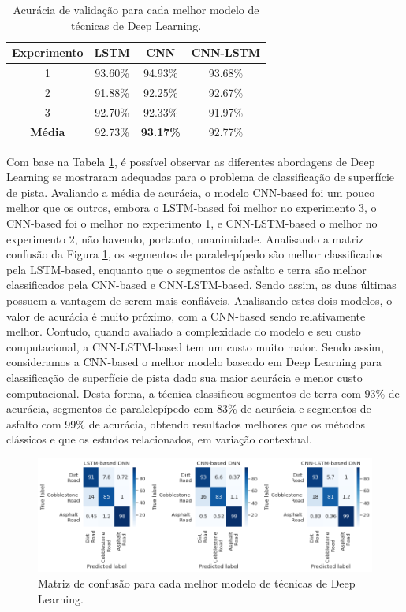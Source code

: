 \begin{table}[h!]
\caption{Acurácia de validação para cada melhor modelo de técnicas de Deep Learning.} 
\label{table:deep_ml_results}
\centering
\small
\begin{tabular}{cccc}
\toprule
\textbf{Experimento} & 
\textbf{LSTM} & 
\textbf{CNN} & 
\textbf{CNN-LSTM} \\ \midrule
1 & 93.60\% & 94.93\% & 93.68\% \\ \midrule
2 & 91.88\% & 92.25\% & 92.67\% \\ \midrule
3 & 92.70\% & 92.33\% & 91.97\% \\ \midrule
\textbf{Média} & 92.73\% & \textbf{93.17\%} & 92.77\% \\ \bottomrule
\end{tabular}
\end{table}

Com base na Tabela \ref{table:deep_ml_results}, é possível observar as diferentes abordagens de Deep Learning se mostraram adequadas para o problema de classificação de superfície de pista. Avaliando a média de acurácia, o modelo CNN-based foi um pouco melhor que os outros, embora o LSTM-based foi melhor no experimento 3, o CNN-based foi o melhor no experimento 1, e CNN-LSTM-based o melhor no experimento 2, não havendo, portanto, unanimidade. Analisando a matriz confusão da Figura \ref{fig:confusion_matrix_deep}, os segmentos de paralelepípedo são melhor classificados pela LSTM-based, enquanto que o segmentos de asfalto e terra são melhor classificados pela CNN-based e CNN-LSTM-based. Sendo assim, as duas últimas possuem a vantagem de serem mais confiáveis. Analisando estes dois modelos, o valor de acurácia é muito próximo, com a CNN-based sendo relativamente melhor. Contudo, quando avaliado a complexidade do modelo e seu custo computacional, a CNN-LSTM-based tem um custo muito maior. Sendo assim, consideramos a CNN-based o melhor modelo baseado em Deep Learning para classificação de superfície de pista dado sua maior acurácia e menor custo computacional. Desta forma, a técnica classificou segmentos de terra com 93\% de acurácia, segmentos de paralelepípedo com 83\% de acurácia e segmentos de asfalto com 99\% de acurácia, obtendo resultados melhores que os métodos clássicos e que os estudos relacionados, em variação contextual.

\begin{figure}[h!]
  \centering
  \includegraphics[width=1\textwidth]{figuras/confusion_matrix_deep.png}
  \caption{Matriz de confusão para cada melhor modelo de técnicas de Deep Learning.}
  \label{fig:confusion_matrix_deep}
\end{figure}
